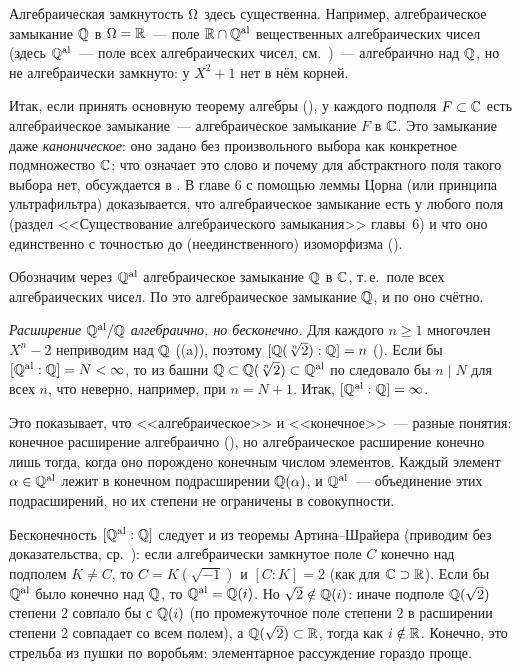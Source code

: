 Алгебраическая замкнутость $\Omega$ здесь существенна. Например, алгебраическое замыкание $\mathbb Q$ в $\Omega=\mathbb R$~--- поле
$\mathbb R\cap\mathbb Q^{\mathrm{al}}$ вещественных алгебраических чисел (здесь $\mathbb Q^{\mathrm{al}}$~--- поле всех алгебраических чисел, см.\ )~---
алгебраично над $\mathbb Q$, но не алгебраически замкнуто: у $X^2+1$ нет в нём
корней.

Итак, если принять основную теорему алгебры (), у каждого подполя $F\subset\mathbb C$ есть алгебраическое замыкание~---
алгебраическое замыкание $F$ в $\mathbb C$. Это замыкание даже \emph{каноническое}: оно задано без произвольного выбора как
конкретное подмножество $\mathbb C$; что означает это слово и почему для абстрактного поля такого выбора нет, обсуждается в
. В главе 6 с помощью леммы Цорна (или принципа ультрафильтра) доказывается, что алгебраическое замыкание есть у
любого поля (раздел <<Существование алгебраического замыкания>> главы~6) и что оно единственно с точностью до
(неединственного) изоморфизма ().

\begin{example}
Обозначим через $\mathbb Q^{\mathrm{al}}$ алгебраическое замыкание $\mathbb Q$ в $\mathbb C$, т.\,е.\ поле всех алгебраических чисел. По  это
алгебраическое замыкание $\mathbb Q$, и по  оно счётно.

\emph{Расширение $\mathbb Q^{\mathrm{al}}/\mathbb Q$ алгебраично, но бесконечно.} Для каждого $n\ge1$ многочлен $X^n-2$ неприводим над $\mathbb Q$
((a)), поэтому $[\mathbb Q(\sqrt[n]2):\mathbb Q]=n$ (). Если бы $[\mathbb Q^{\mathrm{al}}:\mathbb Q]=N<\infty$, то из
башни $\mathbb Q\subset\mathbb Q(\sqrt[n]2)\subset\mathbb Q^{\mathrm{al}}$ по  следовало бы $n\mid N$ для всех $n$, что неверно, например, при
$n=N+1$. Итак, $[\mathbb Q^{\mathrm{al}}:\mathbb Q]=\infty$.

Это показывает, что <<алгебраическое>> и <<конечное>>~--- разные понятия: конечное расширение алгебраично (), но
алгебраическое расширение конечно лишь тогда, когда оно порождено конечным числом элементов. Каждый элемент
$\alpha\in\mathbb Q^{\mathrm{al}}$ лежит в конечном подрасширении $\mathbb Q(\alpha)$, и $\mathbb Q^{\mathrm{al}}$~--- объединение этих подрасширений, но их степени
не ограничены в совокупности.
\end{example}

\begin{aside}[1.47b]
Бесконечность $[\mathbb Q^{\mathrm{al}}:\mathbb Q]$ следует и из теоремы Артина--Шрайера (приводим без доказательства, ср.\ ): если алгебраически замкнутое поле $C$ конечно над
подполем $K\ne C$, то $C=K(\sqrt{-1})$ и $[C:K]=2$ (как для $\mathbb C\supset\mathbb R$). Если бы $\mathbb Q^{\mathrm{al}}$ было конечно над $\mathbb Q$, то
$\mathbb Q^{\mathrm{al}}=\mathbb Q(i)$. Но $\sqrt2\notin\mathbb Q(i)$: иначе подполе $\mathbb Q(\sqrt2)$ степени $2$ совпало бы с $\mathbb Q(i)$ (по  промежуточное
поле степени $2$ в расширении степени $2$ совпадает со всем полем), а $\mathbb Q(\sqrt2)\subset\mathbb R$, тогда как $i\notin\mathbb R$.
Конечно, это стрельба из пушки по воробьям: элементарное рассуждение  гораздо проще.
\end{aside}

